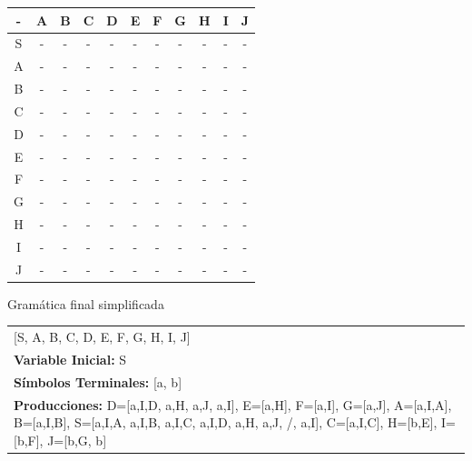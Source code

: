 \documentclass[a4paper,11pt]{article}
\newcommand{\MYp}[1]{ {\color[rgb]{0.392,0.392,0.392}#1} }
\begin{document}
\begin{center}
\begin{tabular}{||c||c||c||c||c||c||c||c||c||c||c||}
\hline
\hline
- & A & B & C & D & E & F & G & H & I & J \\
\hline
\hline
S & - & - & - & - & - & - & - & - & - & - \\
\hline
\hline
A & - & - & - & - & - & - & - & - & - & - \\
\hline
\hline
B & - & - & - & - & - & - & - & - & - & - \\
\hline
\hline
C & - & - & - & - & - & - & - & - & - & - \\
\hline
\hline
D & - & - & - & - & - & - & - & - & - & - \\
\hline
\hline
E & - & - & - & - & - & - & - & - & - & - \\
\hline
\hline
F & - & - & - & - & - & - & - & - & - & - \\
\hline
\hline
G & - & - & - & - & - & - & - & - & - & - \\
\hline
\hline
H & - & - & - & - & - & - & - & - & - & - \\
\hline
\hline
I & - & - & - & - & - & - & - & - & - & - \\
\hline
\hline
J & - & - & - & - & - & - & - & - & - & - \\
\hline
\hline
\end{tabular}
\end{center}

\MYp{\Huge Gram\'{a}tica final simplificada}
\newline\begin{center}\begin{tabular}{ m{15cm} }

\noindent {\bf Variables: }[S, A, B, C, D, E, F, G, H, I, J] \\
{\bf Variable Inicial: }S \\ 
{\bf S\'{i}mbolos Terminales: }[a, b] \\ 
{\bf Producciones: }{D=[a,I,D, a,H, a,J, a,I], E=[a,H], F=[a,I], G=[a,J], A=[a,I,A], B=[a,I,B], S=[a,I,A, a,I,B, a,I,C, a,I,D, a,H, a,J, /, a,I], C=[a,I,C], H=[b,E], I=[b,F], J=[b,G, b]} \\ 
\end{tabular}
\end{center}
\end{document}
